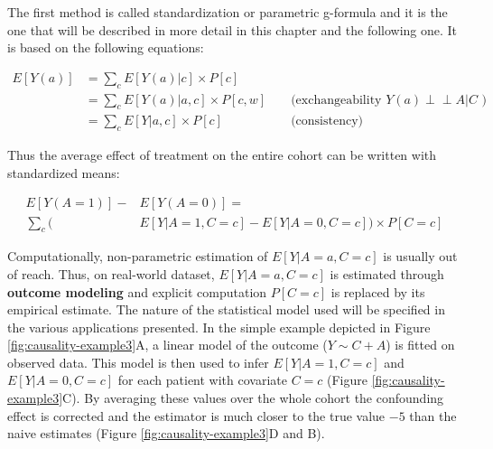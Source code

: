 \documentclass[a4paper,12pt,twoside,onecolumn,openright,final,oldfontcommands]{memoir}
\begin{document}
The first method is called standardization or parametric g-formula and
it is the one that will be described in more detail in this chapter and
the following one. It is based on the following equations:

\begin{equation*}
\begin{aligned}
  E[Y(a)] & = \sum_{c} E[Y(a)|c] \times P[c] \\
          & = \sum_{c} E[Y(a)|a,c] \times P[c,w]
          &&\text{ (exchangeability } Y(a) \perp \!\!\! \perp A | C \text{ )} \\
          & = \sum_{c} E[Y|a,c] \times P[c]
          &&\text{ (consistency)}
\end{aligned}
\end{equation*}

Thus the average effect of treatment on the entire cohort can be written
with standardized means:

\begin{equation}
\begin{aligned}
  E[Y(A=1)] - & E[Y(A=0)] = \\ 
   \sum_{c} \Big( & E[Y | A=1, C=c]-E[Y | A=0, C=c]\Big) \times P[C=c]
\end{aligned}
\end{equation}

Computationally, non-parametric estimation of \(E[Y | A=a, C=c]\) is
usually out of reach. Thus, on real-world dataset, \(E[Y | A=a, C=c]\)
is estimated through \textbf{outcome modeling} and explicit computation
\(P[C=c]\) is replaced by its empirical estimate. The nature of the
statistical model used will be specified in the various applications
presented. In the simple example depicted in Figure
\ref{fig:causality-example3}A, a linear model of the outcome
(\(Y\sim C+A\)) is fitted on observed data. This model is then used to
infer \(E[Y | A=1, C=c]\) and \(E[Y | A=0, C=c]\) for each patient with
covariate \(C=c\) (Figure \ref{fig:causality-example3}C). By averaging
these values over the whole cohort the confounding effect is corrected
and the estimator is much closer to the true value \(-5\) than the naive
estimates (Figure \ref{fig:causality-example3}D and B).
\end{document}
